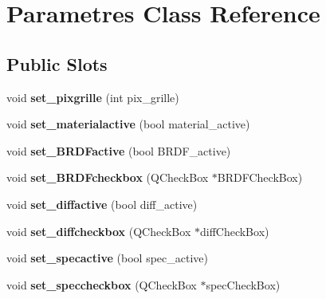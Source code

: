 \hypertarget{class_parametres}{
\section{Parametres Class Reference}
\label{class_parametres}
}
\subsection*{Public Slots}
\begin{DoxyCompactItemize}
\item 
\hypertarget{class_parametres_a658b32829e5c44fef51dd3810da54269}{
void {\bfseries set\_\-pixgrille} (int pix\_\-grille)}
\label{class_parametres_a658b32829e5c44fef51dd3810da54269}

\item 
\hypertarget{class_parametres_a67257ac62859abe9b12e73e2855584ed}{
void {\bfseries set\_\-materialactive} (bool material\_\-active)}
\label{class_parametres_a67257ac62859abe9b12e73e2855584ed}

\item 
\hypertarget{class_parametres_ad72016ae73392130bc0847aeb052049e}{
void {\bfseries set\_\-BRDFactive} (bool BRDF\_\-active)}
\label{class_parametres_ad72016ae73392130bc0847aeb052049e}

\item 
\hypertarget{class_parametres_a4787a8e8f4c9fac76f064838cfede189}{
void {\bfseries set\_\-BRDFcheckbox} (QCheckBox $\ast$BRDFCheckBox)}
\label{class_parametres_a4787a8e8f4c9fac76f064838cfede189}

\item 
\hypertarget{class_parametres_a61fc37779e0be7f9d5945d3738b83bf0}{
void {\bfseries set\_\-diffactive} (bool diff\_\-active)}
\label{class_parametres_a61fc37779e0be7f9d5945d3738b83bf0}

\item 
\hypertarget{class_parametres_aa4cd01d40258b81c871b5e1d9fc958b3}{
void {\bfseries set\_\-diffcheckbox} (QCheckBox $\ast$diffCheckBox)}
\label{class_parametres_aa4cd01d40258b81c871b5e1d9fc958b3}

\item 
\hypertarget{class_parametres_ab83000ae05b6f433af197b627365b0c4}{
void {\bfseries set\_\-specactive} (bool spec\_\-active)}
\label{class_parametres_ab83000ae05b6f433af197b627365b0c4}

\item 
\hypertarget{class_parametres_a4fdf6b1e4788d891d907dfa555ab6aa2}{
void {\bfseries set\_\-speccheckbox} (QCheckBox $\ast$specCheckBox)}
\label{class_parametres_a4fdf6b1e4788d891d907dfa555ab6aa2}


\end{DoxyCompactItemize}
